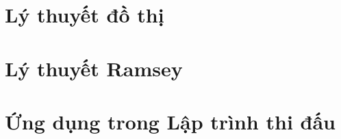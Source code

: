 \documentclass[12pt, a4paper, english]{article}
\begin{document}
    \section{Lý thuyết đồ thị}
      
      
    \section{Lý thuyết Ramsey}
      
      
    \section{Ứng dụng trong Lập trình thi đấu}
  \newpage


  \printbibliography[title={Tài liệu}]
\end{document}
